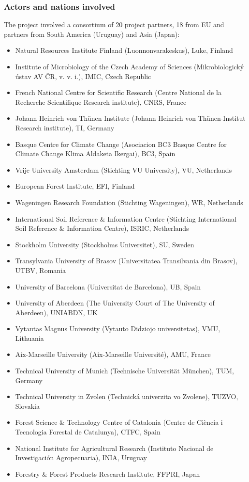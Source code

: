 \documentclass[12pt,a4paper]{article}
\begin{document}
\subsubsection{Actors and nations involved}
The project involved a consortium of 20 project partners, 18 from EU and partners from South America (Uruguay) and Asia (Japan):
\begin{itemize}
\item Natural Resources Institute Finland (Luonnonvarakeskus), Luke, Finland
\item Institute of Microbiology of the Czech Academy of Sciences (Mikrobiologický ústav AV ČR, v. v. i.), IMIC, Czech Republic
\item French National Centre for Scientific Research (Centre National de la Recherche Scientifique Research institute), CNRS, France
\item Johann Heinrich von Thünen Institute (Johann Heinrich von Thünen-Institut Research institute), TI, Germany
\item Basque Centre for Climate Change (Asociacion BC3 Basque Centre for Climate Change Klima Aldaketa Ikergai), BC3, Spain
\item Vrije University Amsterdam (Stichting VU University), VU, Netherlands
\item European Forest Institute, EFI, Finland
\item Wageningen Research Foundation (Stichting Wageningen), WR, Netherlands
\item International Soil Reference \& Information Centre (Stichting International Soil Reference \& Information Centre), ISRIC, Netherlands
\item Stockholm University (Stockholms Universitet), SU, Sweden
\item Transylvania University of Brașov (Universitatea Transilvania din Brașov), UTBV, Romania
\item University of Barcelona (Universitat de Barcelona), UB, Spain
\item University of Aberdeen (The University Court of The University of Aberdeen), UNIABDN, UK
\item Vytautas Magnus University (Vytauto Didziojo universitetas), VMU, Lithuania
\item Aix-Marseille University (Aix-Marseille Université), AMU, France
\item Technical University of Munich (Technische Universität München), TUM, Germany
\item Technical University in Zvolen (Technick\'{a} univerzita vo Zvolene), TUZVO, Slovakia
\item Forest Science \& Technology Centre of Catalonia (Centre de Ciència i Tecnologia Forestal de Catalunya), CTFC, Spain
\item National Institute for Agricultural Research (Instituto Nacional de Investigación Agropecuaria), INIA, Uruguay
\item Forestry \& Forest Products Research Institute, FFPRI, Japan
\end{itemize}
\end{document}
